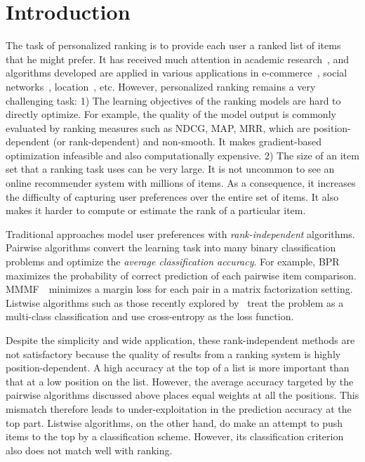 \documentclass[letterpaper]{article} %
\begin{document}
\section{Introduction}

The task of personalized ranking is to provide each user a ranked list of items that he might prefer. It has received much attention in academic research~\cite{hu2008collaborative,rendle2009bpr,he2016fast}, and algorithms developed are applied in various applications in e-commerce~\cite{linden2003amazon}, social networks~\cite{chen2009make}, location~\cite{liu2014exploiting}, etc. However, personalized ranking remains a very challenging task: 1) The learning objectives of the ranking models are hard to directly optimize. For example, the quality of the model output is commonly evaluated by ranking measures such as NDCG, MAP, MRR, which are position-dependent (or rank-dependent) and non-smooth. It makes gradient-based optimization infeasible and also computationally expensive. 2) The size of an item set that a ranking task uses can be very large. It is not uncommon to see an online recommender system with millions of items. As a consequence, it increases the difficulty of capturing user preferences over the entire set of items. It also makes it harder to compute or estimate the rank of a particular item.

Traditional approaches model user preferences with \textit{rank-independent} algorithms. Pairwise algorithms convert the learning task into many binary classification problems and optimize the \textit{average classification accuracy}. For example, BPR~\cite{rendle2009bpr,rendle2014improving} maximizes the probability of correct prediction of each pairwise item comparison. MMMF~\cite{srebro2005maximum}~minimizes a margin loss for each pair in a matrix factorization setting. Listwise algorithms such as those recently explored by~\cite{hidasi2015session,covington2016deep} treat the problem as a multi-class classification and use cross-entropy as the loss function.

Despite the simplicity and wide application, these rank-independent methods are not satisfactory because the quality of results from a ranking system is highly position-dependent. A high accuracy at the top of a list is more important than that at a low position on the list. However, the average accuracy targeted by the pairwise algorithms discussed above places equal weights at all the positions. This mismatch therefore leads to under-exploitation in the prediction accuracy at the top part. Listwise algorithms, on the other hand, do make an attempt to push items to the top by a classification scheme. However, its classification criterion also does not match well with ranking.
\end{document}

